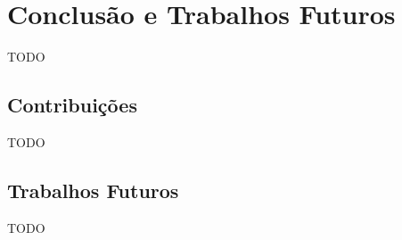 \chapter{Conclusão e Trabalhos Futuros}
\label{ch:5}
TODO

\section{Contribuições}
TODO

\section{Trabalhos Futuros}
TODO